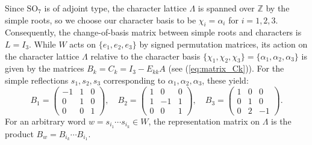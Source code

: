 \documentclass[11pt,english]{amsart}
\numberwithin{equation}{section}
\numberwithin{figure}{section}
\theoremstyle{plain}
\theoremstyle{plain}
\theoremstyle{definition}
\theoremstyle{remark}
\begin{document}
Since $\mathrm{SO}_7$ is of adjoint type, the character lattice $\Lambda$ is spanned over $\mathbb{Z}$ by the simple roots, so we choose our character basis to be $\chi_i = \alpha_i$ for $i=1,2,3$. Consequently, the change-of-basis matrix between simple roots and characters is $L = I_3$. While $W$ acts on $\{e_1, e_2, e_3\}$ by signed permutation matrices, its action on the character lattice $\Lambda$ relative to the character basis $\{\chi_1, \chi_2, \chi_3\} = \{\alpha_1, \alpha_2, \alpha_3\}$ is given by the matrices $B_{k} = C_k= I_3 - E_{kk} A$ (see (\ref{eq:matrix_Ck})). For the simple reflections $s_1, s_2, s_3$ corresponding to $\alpha_1, \alpha_2, \alpha_3$, these yield:
\[
B_{1} = \begin{pmatrix} -1 & 1 & 0 \\ 0 & 1 & 0 \\ 0 & 0 & 1 \end{pmatrix}, \quad 
B_{2} = \begin{pmatrix} 1 & 0 & 0 \\ 1 & -1 & 1 \\ 0 & 0 & 1 \end{pmatrix}, \quad 
B_{3} = \begin{pmatrix} 1 & 0 & 0 \\ 0 & 1 & 0 \\ 0 & 2 & -1 \end{pmatrix}.
\]
For an arbitrary word $w = s_{i_1} \cdots s_{i_k} \in W$, the representation matrix on $\Lambda$ is the product $B_w = B_{i_k} \cdots B_{i_1}$.
\end{document}
